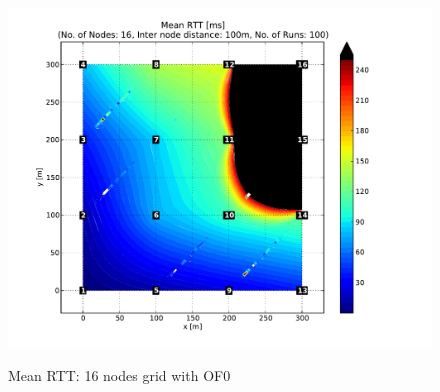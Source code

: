 \begin{figure}[htbp]
{      \includegraphics[scale=0.23]{Pics/results/16/OF0/grid/dist100_montecarlo_contour.pdf}}
  \caption{Mean RTT: 16 nodes grid with OF0}
 \label{fig:rtt_16_grid_of0}
\end{figure}

